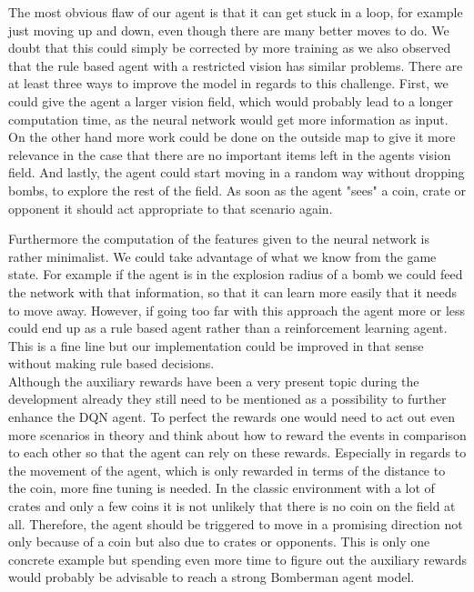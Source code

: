 The most obvious flaw of our agent is that it can get stuck in a loop, for example just moving up and down, even though there are many better moves to do. We doubt that this could simply be corrected by more training as we also observed that the rule based agent with a restricted vision has similar problems. There are at least three ways to improve the model in regards to this challenge. First, we could give the agent a larger vision field, which would probably lead to a longer computation time, as the neural network would get more information as input. On the other hand more work could be done on the outside map to give it more relevance in the case that there are no important items left in the agents vision field. And lastly, the agent could start moving in a random way without dropping bombs, to explore the rest of the field. As soon as the agent "sees" a coin, crate or opponent it should act appropriate to that scenario again.

Furthermore the computation of the features given to the neural network is rather minimalist. We could take advantage of what we know from the game state. For example if the agent is in the explosion radius of a bomb we could feed the network with that information, so that it can learn more easily that it needs to move away. However, if going too far with this approach the agent more or less could end up as a rule based agent rather than a reinforcement learning agent. This is a fine line but our implementation could be improved in that sense without making rule based decisions.\\ 

Although the auxiliary rewards have been a very present topic during the development already they still need to be mentioned as a possibility to further enhance the DQN agent. To perfect the rewards one would need to act out even more scenarios in theory and think about how to reward the events in comparison to each other so that the agent can rely on these rewards. Especially in regards to the movement of the agent, which is only rewarded in terms of the distance to the coin, more fine tuning is needed. In the classic environment with a lot of crates and only a few coins it is not unlikely that there is no coin on the field at all. Therefore, the agent should be triggered to move in a promising direction not only because of a coin but also due to crates or opponents. This is only one concrete example but spending even more time to figure out the auxiliary rewards would probably be advisable to reach a strong Bomberman agent model. \\

